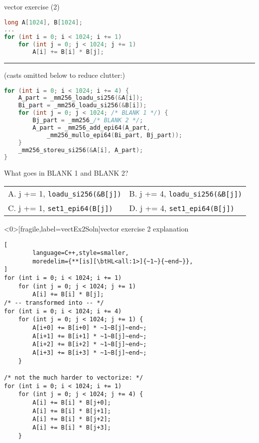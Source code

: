 \begin{frame}[fragile,label=vectorExercise2A]{vector exercise (2)}
\vspace{-.2cm}
\begin{lstlisting}[language=C++,style=smaller]
long A[1024], B[1024];
...
for (int i = 0; i < 1024; i += 1)
    for (int j = 0; j < 1024; j += 1)
        A[i] += B[i] * B[j];
\end{lstlisting}
\hrule
{\fontsize{9}{10}\selectfont (casts omitted below to reduce clutter:)}
\begin{lstlisting}[language=C++,style=smaller]
for (int i = 0; i < 1024; i += 4) {
    A_part = _mm256_loadu_si256(&A[i]);
    Bi_part = _mm256_loadu_si256(&B[i]);
    for (int j = 0; j < 1024; /* BLANK 1 */) {
        Bj_part = _mm256_/* BLANK 2 */;
        A_part = _mm256_add_epi64(A_part,
            _mm256_mullo_epi64(Bi_part, Bj_part));
    }
    _mm256_storeu_si256(&A[i], A_part);
}
\end{lstlisting}
\small
What goes in BLANK 1 and BLANK 2? \\
\begin{tabular}{ll}
A. j += 1, {\small\tt loadu\_si256(\&B[j])} & B. j += 4, {\small\tt loadu\_si256(\&B[j])} \\
C. j += 1, {\small \tt set1\_epi64(B[j])} & D. j += 4, {\small\tt set1\_epi64(B[j])} \\
\end{tabular}
\end{frame}

\begin{frame}<0>[fragile,label=vectEx2Soln]{vector exercise 2 explanation}
\begin{lstlisting}[
        language=C++,style=smaller,
        moredelim={**[is][\btHL<all:1>]{~1~}{~end~}},
]
for (int i = 0; i < 1024; i += 1)
    for (int j = 0; j < 1024; j += 1)
        A[i] += B[i] * B[j];
/* -- transformed into -- */
for (int i = 0; i < 1024; i += 4)
    for (int j = 0; j < 1024; j += 1) {
        A[i+0] += B[i+0] * ~1~B[j]~end~;
        A[i+1] += B[i+1] * ~1~B[j]~end~;
        A[i+2] += B[i+2] * ~1~B[j]~end~;
        A[i+3] += B[i+3] * ~1~B[j]~end~;
    }

/* not the much harder to vectorize: */
for (int i = 0; i < 1024; i += 1)
    for (int j = 0; j < 1024; j += 4) {
        A[i] += B[i] * B[j+0];
        A[i] += B[i] * B[j+1];
        A[i] += B[i] * B[j+2];
        A[i] += B[i] * B[j+3];
    }
\end{lstlisting}
\end{frame}

